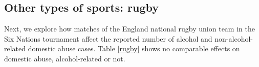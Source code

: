 \documentclass[12pt, a4paper]{article}
\begin{document}
\subsection{Other types of sports: rugby}



Next, we explore how matches of the England national rugby union team in the Six Nations tournament affect the reported number of alcohol and non-alcohol-related domestic abuse cases. Table \ref{rugby} shows no comparable effects on domestic abuse, alcohol-related or not.

\end{document}
